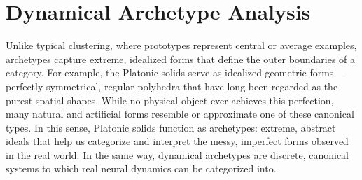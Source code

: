 \documentclass{article}
\theoremstyle{definition} \newtheorem{definition}{Definition}  \newtheorem{example}{Example}
\theoremstyle{remark} \newtheorem{remark}{Remark}
\newcounter{ct}
\begin{document}

\section{Dynamical Archetype Analysis}\label{sec:dmm}\label{sec:daa}
Unlike typical clustering, where prototypes represent central or average examples, archetypes capture extreme, idealized forms that define the outer boundaries of a category. For example, the Platonic solids serve as idealized geometric forms—perfectly symmetrical, regular polyhedra that have long been regarded as the purest spatial shapes. While no physical object ever achieves this perfection, many natural and artificial forms resemble or approximate one of these canonical types. In this sense, Platonic solids function as archetypes: extreme, abstract ideals that help us categorize and interpret the messy, imperfect forms observed in the real world.  In the same way, dynamical archetypes are discrete, canonical systems to which real neural dynamics can be categorized into.
\end{document}
